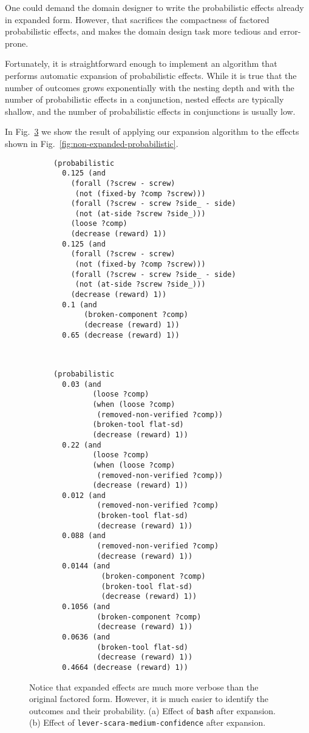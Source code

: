 \documentclass[../root.tex]{subfiles}
\begin{document}
One could demand the domain designer to write the probabilistic
effects already in expanded form. However, that sacrifices the
compactness of factored probabilistic effects, and makes the domain
design task more tedious and error-prone.

Fortunately, it is straightforward enough to implement an algorithm
that performs automatic expansion of probabilistic effects. While
it is true that the number of outcomes grows exponentially with the
nesting depth and with the number of probabilistic effects in
a conjunction, nested effects are typically shallow, and the number
of probabilistic effects in conjunctions is usually low.

In Fig.~\ref{fig:expanded-probabilistic} we show the result
of applying our expansion algorithm to the
effects shown in Fig.~\ref{fig:non-expanded-probabilistic}.

\begin{figure}[tbhp]
\centering
\begin{subfigure}[m]{0.48\columnwidth}
\begin{lstlisting}[numbers=none]
(probabilistic
  0.125 (and
    (forall (?screw - screw)
     (not (fixed-by ?comp ?screw)))
    (forall (?screw - screw ?side_ - side)
     (not (at-side ?screw ?side_)))
    (loose ?comp)
    (decrease (reward) 1))
  0.125 (and
    (forall (?screw - screw)
     (not (fixed-by ?comp ?screw)))
    (forall (?screw - screw ?side_ - side)
     (not (at-side ?screw ?side_)))
    (decrease (reward) 1))
  0.1 (and
       (broken-component ?comp)
       (decrease (reward) 1))
  0.65 (decrease (reward) 1))
\end{lstlisting}
\caption{}
\label{fig:nested-probabilistic-expanded}
\end{subfigure}
~
\begin{subfigure}[m]{0.48\columnwidth}
\begin{lstlisting}[numbers=none]
(probabilistic
  0.03 (and
	     (loose ?comp)
	     (when (loose ?comp)
	      (removed-non-verified ?comp))
	     (broken-tool flat-sd)
	     (decrease (reward) 1))
  0.22 (and
         (loose ?comp)
         (when (loose ?comp)
          (removed-non-verified ?comp))
         (decrease (reward) 1))
  0.012 (and
          (removed-non-verified ?comp)
          (broken-tool flat-sd)
          (decrease (reward) 1))
  0.088 (and
          (removed-non-verified ?comp)
          (decrease (reward) 1))
  0.0144 (and
           (broken-component ?comp)
           (broken-tool flat-sd)
           (decrease (reward) 1))
  0.1056 (and
		  (broken-component ?comp)
		  (decrease (reward) 1))
  0.0636 (and
          (broken-tool flat-sd)
          (decrease (reward) 1))
  0.4664 (decrease (reward) 1))
\end{lstlisting}
\caption{}
\label{fig:conjunction-probabilistic-expanded}
\end{subfigure}
\caption{
Notice that expanded effects are much more verbose than the original
factored form. However, it is much easier to identify the outcomes and
their probability.
(a) Effect of \texttt{bash} after expansion.
(b) Effect of \texttt{lever-scara-medium-confidence} after expansion.
}
\label{fig:expanded-probabilistic}
\end{figure}
\end{document}
